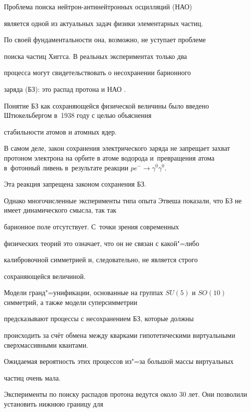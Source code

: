  Проблема поиска нейтрон-антинейтронных осцилляций (НАО)

является  одной из актуальных задач физики элементарных частиц.

По своей фундаментальности она, возможно, не уступает проблеме

поиска  частиц Хиггса. В реальных экспериментах только два

процесса  могут свидетельствовать о несохранении барионного

заряда (БЗ): это  распад протона и НАО \cite{mol1,mol2}.



Понятие БЗ как сохраняющейся физической величины было введено Штюкельбергом в~1938 году с целью объяснения

стабильности атомов и атомных ядер. 

В самом деле, закон  сохранения электрического заряда не запрещает захват протоном  электрона на орбите в атоме водорода и~превращения атома в~фотонный ливень в~результате реакции $p e^{-} \to \gamma^0 \gamma^0$. 

Эта реакция запрещена законом  сохранения БЗ.



Однако многочисленные эксперименты типа опыта Этвеша показали, что БЗ не имеет динамического смысла, так так

 барионное  поле отсутствует. С~точки зрения современных

 физических теорий это означает, что он не связан с какой"=либо

 калибровочной симметрией и, следовательно, не является строго

 сохраняющейся величиной.



 Модели гранд"=унификации, основанные на группах  $SU(5)$  и $SO(10)$ симметрий, а также модели суперсимметрии

 предсказывают  процессы с несохранением БЗ, которые должны

 происходить  за счёт обмена между кварками гипотетическими  виртуальными  сверхмассивными квантами. 

Ожидаемая  вероятность этих  процессов из"=за большой массы виртуальных

частиц очень мала.



 Эксперименты по поиску распадов протона ведутся  около 30 лет. Они позволили установить нижнюю границу для

